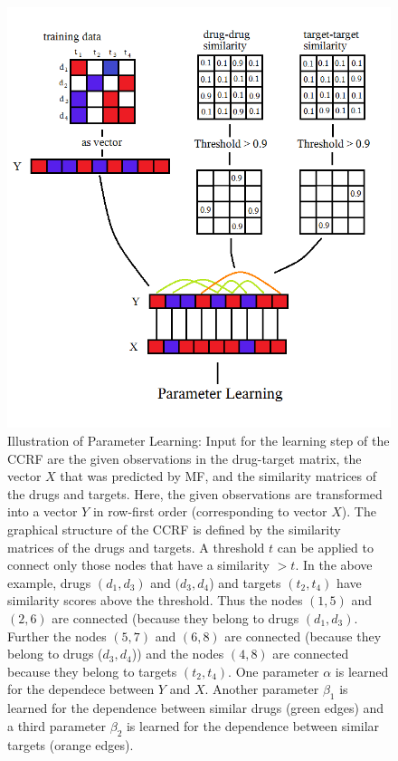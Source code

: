 \begin{figure}
\begin{center}
\includegraphics[scale=0.6]{ccrf_input.png}
\end{center}
\caption{Illustration of Parameter Learning: Input for the learning step of the CCRF are the given observations in the drug-target matrix, the vector $X$ that was predicted by MF, and the similarity matrices of the drugs and targets. Here, the given observations are transformed into a vector $Y$ in row-first order (corresponding to vector $X$). The graphical structure of the CCRF is defined by the similarity matrices of the drugs and targets. A threshold $t$ can be applied to connect only those nodes that have a similarity $>t$. In the above example, drugs $(d_1, d_3)$ and $(d_3, d_4$) and targets $(t_2, t_4)$ have similarity scores above the threshold. Thus the nodes $(1,5)$ and $(2,6)$ are connected (because they belong to drugs $(d_1, d_3)$. Further the nodes $(5,7)$ and $(6,8)$ are connected (because they belong to drugs ($d_3, d_4$)) and the nodes $(4,8)$ are connected because they belong to targets $(t_2, t_4)$. One parameter $\alpha$ is learned for the dependece between $Y$ and $X$. Another parameter $\beta_1$ is learned for the dependence between similar drugs (green edges) and a third parameter $\beta_2$ is learned for the dependence between similar targets (orange edges).}
\label{fig:ccrf_X}
\end{figure}


